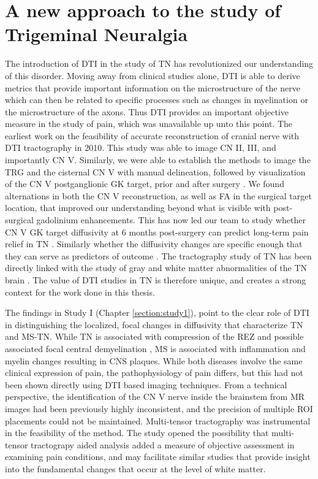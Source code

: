 \section{A new approach to the study of Trigeminal Neuralgia}


The introduction of DTI in the study of TN has revolutionized our understanding of this disorder. Moving away from clinical studies alone, DTI is able to derive metrics that provide important information on the microstructure of the nerve which can then be related to specific processes such as changes in myelination or the microstructure of the axons. Thus DTI provides an important objective measure in the study of pain, which was unavailable up unto this point. The earliest work on the feasibility of accurate reconstruction of cranial nerve with DTI tractography \cite{Hodaie2010} in 2010. This study was able to image CN II, III, and importantly CN V. Similarly, we were able to establish the methods to image the TRG and the cisternal CN V with manual delineation, followed by visualization of the CN V postganglionic GK target, prior and after surgery \cite{Hodaie2012g}. We found alternations in both the CN V reconstruction, as well as FA in the surgical target location, that improved our understanding beyond what is visible with post-surgical gadolinium enhancements. This has now led our team to study whether CN V GK target diffusivity at 6 months post-surgery can predict long-term pain relief in TN \cite{Tohyama2018}. Similarly whether the diffusivity changes are specific enough that they can serve as predictors of outcome \cite{Hung2017}. The tractography study of TN has been directly linked with the study of gray and white matter abnormalities of the TN brain \cite{Desouza2013c}. The value of DTI studies in TN is therefore unique, and creates a strong context for the work done in this thesis. 

The findings in Study I (Chapter \ref{section:study1}), point to the clear role of DTI in distinguishing the localized, focal changes in diffusivity that characterize TN and MS-TN. While TN is associated with compression of the REZ and possible associated focal central demyelination \cite{Devor2002a,Peker2006}, MS is associated with inflammation and myelin changes resulting in CNS plaques. While both diseases involve the same clinical expression of pain, the pathophysiology of pain differs, but this had not been shown directly using DTI based imaging techniques. From a technical perspective, the identification of the CN V nerve inside the brainstem from MR images had been previously highly inconsistent, and the precision of multiple ROI placements could not be maintained. Multi-tensor tractography was instrumental in the feasibility of the method. The study opened the possibility that multi-tensor tractograpy aided analysis added a measure of objective assessment in examining pain conditions, and may facilitate similar studies that provide insight into the fundamental changes that occur at the level of white matter. 

